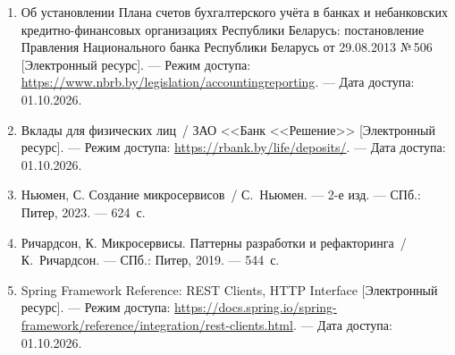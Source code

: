 \documentclass[14pt,a4paper]{extarticle}
\begin{document}

\begin{enumerate}
\item Об установлении Плана счетов бухгалтерского учёта в банках и небанковских
кредитно-финансовых организациях Республики Беларусь: постановление Правления Национального
банка Республики Беларусь от 29.08.2013 №\,506 [Электронный ресурс]. --- Режим доступа:
\url{https://www.nbrb.by/legislation/accountingreporting}. --- Дата доступа: 01.10.2026.
\item Вклады для физических лиц~/ ЗАО <<Банк <<Решение>> [Электронный ресурс]. --- Режим
доступа: \url{https://rbank.by/life/deposits/}. --- Дата доступа: 01.10.2026.
\item Ньюмен, С. Создание микросервисов~/ С.~Ньюмен. --- 2-е изд. --- СПб.: Питер, 2023. ---
624~с.
\item Ричардсон, К. Микросервисы. Паттерны разработки и рефакторинга~/ К.~Ричардсон. ---
СПб.: Питер, 2019. --- 544~с.
\item Spring Framework Reference: REST Clients, HTTP Interface [Электронный ресурс]. ---
Режим доступа: \url{https://docs.spring.io/spring-framework/reference/integration/rest-clients.html}.
--- Дата доступа: 01.10.2026.
\end{enumerate}



\end{document}
